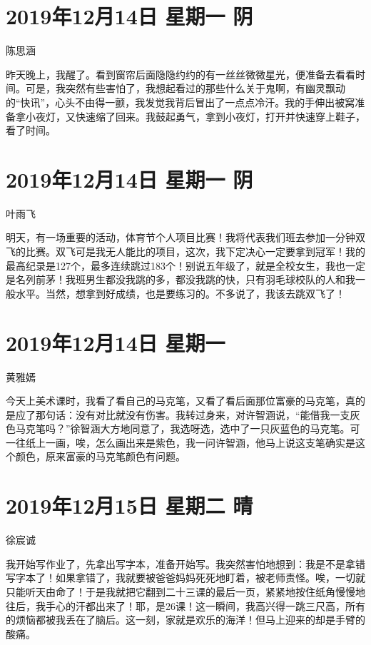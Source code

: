 \section{2019年12月14日 星期一 阴}

陈思涵

昨天晚上，我醒了。看到窗帘后面隐隐约约的有一丝丝微微星光，便准备去看看时间。可是，我突然有些害怕了，我想起看过的那些什么关于鬼啊，有幽灵飘动的``快讯''，心头不由得一颤，我发觉我背后冒出了一点点冷汗。我的手伸出被窝准备拿小夜灯，又快速缩了回来。我鼓起勇气，拿到小夜灯，打开并快速穿上鞋子，看了时间。

\section{2019年12月14日 星期一 阴}

叶雨飞

明天，有一场重要的活动，体育节个人项目比赛！我将代表我们班去参加一分钟双飞的比赛。双飞可是我无人能比的项目，这次，我下定决心一定要拿到冠军！我的最高纪录是127个，最多连续跳过183个！别说五年级了，就是全校女生，我也一定是名列前茅！我班男生都没我跳的多，都没我跳的快，只有羽毛球校队的人和我一般水平。当然，想拿到好成绩，也是要练习的。不多说了，我该去跳双飞了！

\section{2019年12月14日 星期一}

黄雅嫣

今天上美术课时，我看了看自己的马克笔，又看了看后面那位富豪的马克笔，真的是应了那句话：没有对比就没有伤害。我转过身来，对许智涵说，``能借我一支灰色马克笔吗？''徐智涵大方地同意了，我选呀选，选中了一只灰蓝色的马克笔。可一往纸上一画，唉，怎么画出来是紫色，我一问许智涵，他马上说这支笔确实是这个颜色，原来富豪的马克笔颜色有问题。

\section{2019年12月15日 星期二 晴}

徐宸诚

我开始写作业了，先拿出写字本，准备开始写。我突然害怕地想到：我是不是拿错写字本了！如果拿错了，我就要被爸爸妈妈死死地盯着，被老师责怪。唉，一切就只能听天由命了！于是我就把它翻到二十三课的最后一页，紧紧地按住纸角慢慢地往后，我手心的汗都出来了！耶，是26课！这一瞬间，我高兴得一跳三尺高，所有的烦恼都被我丢在了脑后。这一刻，家就是欢乐的海洋！但马上迎来的却是手臂的酸痛。

